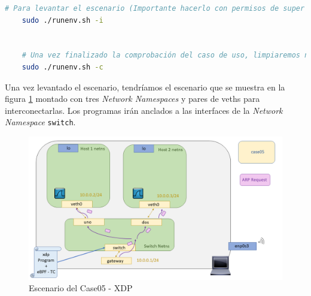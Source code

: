 \begin{lstlisting}[language= bash, style=Consola, caption={Puesta en marcha del escenario - Case05},label=code:case05_xdp_ether_escenario]
    # Para levantar el escenario (Importante hacerlo con permisos de super usuario)
    sudo ./runenv.sh -i
    
    
    # Una vez finalizado la comprobación del caso de uso, limpiaremos nuestra maquina:
    sudo ./runenv.sh -c
\end{lstlisting}
\vspace{0.5cm}
Una vez levantado el escenario, tendríamos el escenario que se muestra en la figura \ref{fig:case05_xdp_ether_scenario4} montado con tres \textit{Network Namespaces} y pares de \gls{veth}s para interconectarlas. Los programas irán anclados a las interfaces de la \textit{Network Namespace} \texttt{switch}.
\begin{figure}[ht]
    \centering
    \includegraphics[width=16cm]{archivos/img/dev/xdp/case05/scenario_03.png}
    \caption{Escenario del Case05 - XDP}
    \label{fig:case05_xdp_ether_scenario4}
\end{figure}


